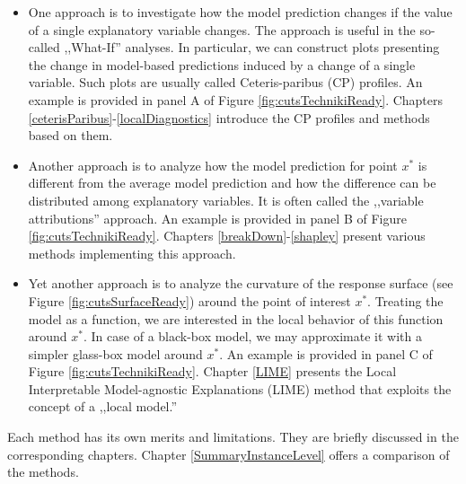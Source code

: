 \documentclass[12pt,]{krantz}
\providecommand{\tightlist}{%
  \setlength{\itemsep}{0pt}\setlength{\parskip}{0pt}}
\begin{document}
\begin{itemize}
\tightlist
\item
  One approach is to investigate how the model prediction changes if the value of a single explanatory variable changes. The approach is useful in the so-called ,,What-If'' analyses. In particular, we can construct plots presenting the change in model-based predictions induced by a change of a single variable. Such plots are usually called Ceteris-paribus (CP) profiles. An example is provided in panel A of Figure \ref{fig:cutsTechnikiReady}. Chapters \ref{ceterisParibus}-\ref{localDiagnostics} introduce the CP profiles and methods based on them.\\
\item
  Another approach is to analyze how the model prediction for point \(x^*\) is different from the average model prediction and how the difference can be distributed among explanatory variables. It is often called the ,,variable attributions'' approach. An example is provided in panel B of Figure \ref{fig:cutsTechnikiReady}. Chapters \ref{breakDown}-\ref{shapley} present various methods implementing this approach.
\item
  Yet another approach is to analyze the curvature of the response surface (see Figure \ref{fig:cutsSurfaceReady}) around the point of interest \(x^*\). Treating the model as a function, we are interested in the local behavior of this function around \(x^*\). In case of a black-box model, we may approximate it with a simpler glass-box model around \(x^*\). An example is provided in panel C of Figure \ref{fig:cutsTechnikiReady}. Chapter \ref{LIME} presents the Local Interpretable Model-agnostic Explanations (LIME) method that exploits the concept of a ,,local model.''
\end{itemize}

Each method has its own merits and limitations. They are briefly discussed in the corresponding chapters. Chapter \ref{SummaryInstanceLevel} offers a comparison of the methods.
\end{document}
